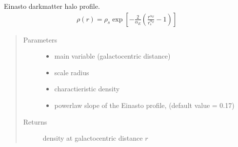\documentclass[letterpaper,10pt,english]{sphinxmanual}
\begin{document}
\begin{fulllineitems}
\label{\detokenize{diffsph.profiles:diffsph.profiles.templates.enst}}
\sphinxAtStartPar
Einasto dark\sphinxhyphen{}matter halo profile.
\begin{equation*}
\begin{split}\rho(r) = \rho_s\exp\left[-\frac{2}{\alpha_E}\left(\frac{r^{\alpha_E}}{r_s^{\alpha_E}}-1\right)\right]\end{split}
\end{equation*}\begin{quote}\begin{description}
\item[{Parameters}] \leavevmode\begin{itemize}
\item {} 
\sphinxAtStartPar
{} \textendash{} main variable (galactocentric distance)

\item {} 
\sphinxAtStartPar
{} \textendash{} scale radius

\item {} 
\sphinxAtStartPar
{} \textendash{} charactieristic density

\item {} 
\sphinxAtStartPar
{} \textendash{} power\sphinxhyphen{}law slope of the Einasto profile, (default value = 0.17)

\end{itemize}

\item[{Returns}] \leavevmode
\sphinxAtStartPar
density at galactocentric distance \(r\)

\end{description}\end{quote}

\end{fulllineitems}

\end{document}
